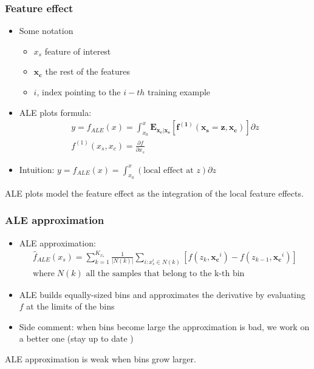 \begin{frame}
  \frametitle{Feature effect}
  \begin{itemize}
  \item Some notation
    \begin{itemize}
    \item $x_s$ feature of interest
    \item $\mathbf{x_c}$ the rest of the features
    \item $i$, index pointing to the $i-th$ training example
    \end{itemize}

  \item ALE plots formula:
    \begin{gather}
      y = f_{ALE}(x) = \int_{x_0}^{x} \mathbf{E_{x_c|x_s}[f^{(1)}(x_s=z,x_c)]} \partial z\\
      f^{(1)}(x_s,x_c) =  \frac{\partial f}{\partial x_s}
    \end{gather}
    \item Intuition: \( y = f_{ALE}(x) = \int_{x_0}^{x} (\text{local effect at } z) \partial z \)
    \end{itemize}
  \noindent\makebox[\linewidth]{\rule{\paperwidth}{0.4pt}}
  ALE plots model the feature effect as the \alert{integration of the local feature effects}.

\end{frame}

\begin{frame}
  \frametitle{ALE approximation}
  \begin{itemize}
  \item ALE approximation:
    \begin{gather} \label{eq:ALE_appr}
      \hat{f}_{ALE}(x_s) = \sum_{k=1}^{K_{x_s}} \frac{1}{|N(k)|} \sum_{i:x_s^i \in N(k)} [f(z_k, \mathbf{x_c}^i) - f(z_{k-1}, \mathbf{x_c}^i)]\\
      \text{where} \; N(k) \text{ all the samples that belong to the k-th bin}
    \end{gather}

  \item ALE builds equally-sized bins and approximates the derivative
    by evaluating $f$ at the limits of the bins
  \item Side comment: when bins become large the approximation is bad,
    we work on a better one (stay up to date \dSmiley )
\end{itemize}
  \noindent\makebox[\linewidth]{\rule{\paperwidth}{0.4pt}}
  ALE approximation is weak when bins grow larger.
\end{frame}

